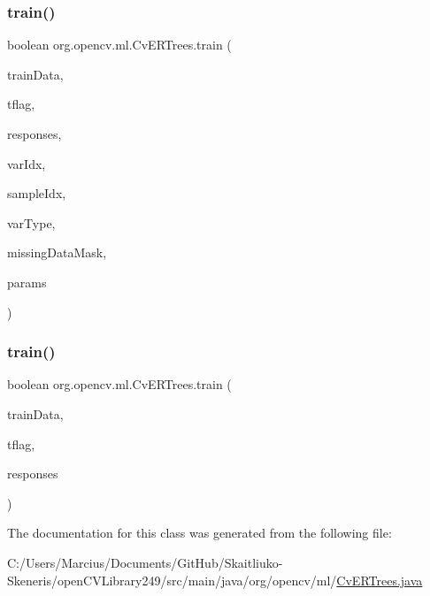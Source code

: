 \subsubsection{\texorpdfstring{train()}{train()}\hspace{0.1cm}{\footnotesize\ttfamily [1/2]}}
{\footnotesize\ttfamily boolean org.\+opencv.\+ml.\+Cv\+E\+R\+Trees.\+train (\begin{DoxyParamCaption}\item[{\mbox{\hyperlink{classorg_1_1opencv_1_1core_1_1_mat}{Mat}}}]{train\+Data,  }\item[{int}]{tflag,  }\item[{\mbox{\hyperlink{classorg_1_1opencv_1_1core_1_1_mat}{Mat}}}]{responses,  }\item[{\mbox{\hyperlink{classorg_1_1opencv_1_1core_1_1_mat}{Mat}}}]{var\+Idx,  }\item[{\mbox{\hyperlink{classorg_1_1opencv_1_1core_1_1_mat}{Mat}}}]{sample\+Idx,  }\item[{\mbox{\hyperlink{classorg_1_1opencv_1_1core_1_1_mat}{Mat}}}]{var\+Type,  }\item[{\mbox{\hyperlink{classorg_1_1opencv_1_1core_1_1_mat}{Mat}}}]{missing\+Data\+Mask,  }\item[{\mbox{\hyperlink{classorg_1_1opencv_1_1ml_1_1_cv_r_t_params}{Cv\+R\+T\+Params}}}]{params }\end{DoxyParamCaption})}

\mbox{\label{classorg_1_1opencv_1_1ml_1_1_cv_e_r_trees_a00e7a35327d4fcc8f6c3835e832d0d0e}} 
\subsubsection{\texorpdfstring{train()}{train()}\hspace{0.1cm}{\footnotesize\ttfamily [2/2]}}
{\footnotesize\ttfamily boolean org.\+opencv.\+ml.\+Cv\+E\+R\+Trees.\+train (\begin{DoxyParamCaption}\item[{\mbox{\hyperlink{classorg_1_1opencv_1_1core_1_1_mat}{Mat}}}]{train\+Data,  }\item[{int}]{tflag,  }\item[{\mbox{\hyperlink{classorg_1_1opencv_1_1core_1_1_mat}{Mat}}}]{responses }\end{DoxyParamCaption})}



The documentation for this class was generated from the following file\+:\begin{DoxyCompactItemize}
\item 
C\+:/\+Users/\+Marcius/\+Documents/\+Git\+Hub/\+Skaitliuko-\/\+Skeneris/open\+C\+V\+Library249/src/main/java/org/opencv/ml/\mbox{\hyperlink{_cv_e_r_trees_8java}{Cv\+E\+R\+Trees.\+java}}\end{DoxyCompactItemize}
